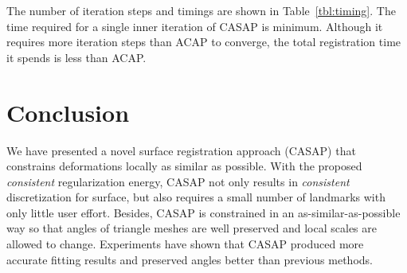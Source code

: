 The number of iteration steps and timings are shown in Table~\ref{tbl:timing}. The time required for a single inner iteration of CASAP is minimum. Although it requires more iteration steps than ACAP to converge, the total registration time it spends is less than ACAP.



\section{Conclusion}
We have presented a novel surface registration approach (CASAP) that constrains deformations locally as similar as possible. With the proposed \emph{consistent} regularization energy, CASAP not only results in \emph{consistent} discretization for surface, but also requires a small number of landmarks with only little user effort. Besides, CASAP is constrained in an as-similar-as-possible way so that angles of triangle meshes are well preserved and local scales are allowed to change. Experiments have shown that CASAP produced more accurate fitting results and preserved angles better than previous methods.



\ifx\isEmbedded\undefined
\pagebreak

\fi
